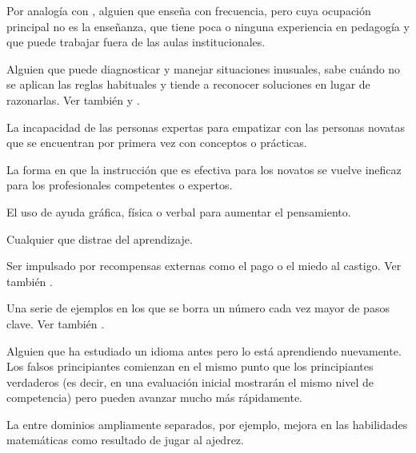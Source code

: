 \begin{description}
 Por analogía con
,
alguien que enseña con frecuencia, pero cuya ocupación principal no es la enseñanza, 
que tiene poca o ninguna experiencia en pedagogía y que puede trabajar fuera de las aulas institucionales.

 Alguien que puede diagnosticar y manejar situaciones inusuales, 
sabe cuándo no se aplican las reglas habituales y tiende a reconocer soluciones en lugar de razonarlas. 
Ver también 
y .

 La incapacidad de las personas expertas 
para empatizar con las personas novatas que se encuentran por primera 
vez con conceptos o prácticas.

 La forma en que 
la instrucción que es efectiva para los novatos se vuelve ineficaz para 
los profesionales competentes o expertos.

 El uso de ayuda gráfica, 
física o verbal para aumentar el pensamiento.

 Cualquier 
que distrae del aprendizaje.

 Ser impulsado por 
recompensas externas como el pago o el miedo al castigo. Ver
también .

 Una serie de ejemplos en los que 
se borra un número cada vez mayor de pasos clave. Ver
también .

 Alguien que ha estudiado un idioma antes pero lo está aprendiendo nuevamente. Los falsos principiantes comienzan en el mismo punto que los principiantes verdaderos (es decir, en una evaluación inicial mostrarán el mismo nivel de competencia) pero pueden avanzar mucho más rápidamente.


 La  entre dominios ampliamente separados, por ejemplo, mejora en las habilidades matemáticas como resultado de jugar al ajedrez.


\end{description}
